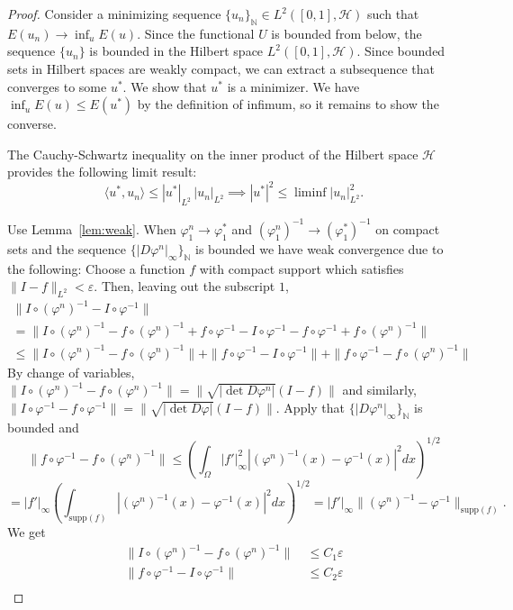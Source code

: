 \documentclass{article}
\theoremstyle{plain}
\theoremstyle{definition}
\newcommand{\N}{\ensuremath{\mathbb{N}}}
\begin{document}
\begin{proof}
Consider a minimizing sequence $\{u_n\}_\N \in L^2([0,1],\mathcal{H})$ such that $E(u_n)\to \inf_u E(u)$. Since the functional $U$ is bounded from below, the sequence $\{u_n\}$ is bounded in the Hilbert space $L^2([0,1],\mathcal{H})$. Since bounded sets in Hilbert spaces are weakly compact, we can extract a subsequence that converges to some $u^*$. We show that $u^*$ is a minimizer. We have $\inf_u E(u)\leq E(u^*)$ by the definition of infimum, so it remains to show the converse.

The Cauchy-Schwartz inequality on the inner product of the Hilbert space $\mathcal{H}$ provides the following limit result:
\[
\langle u^*,u_n\rangle\leq |u^*|_{L^2}\,|u_n|_{L^2} \implies |u^*|^2\leq \liminf |u_n|^2_{L^2}.
\]

Use Lemma~\ref{lem:weak}. 
When $\varphi_1^n\to \varphi_1^*$ and $(\varphi_1^n)^{-1}\to (\varphi_1^*)^{-1}$ on compact sets and the sequence $\{|D\varphi^n|_\infty\}_\N$ is bounded we have weak convergence due to the following: Choose a function $f$ with compact support which satisfies $\|I-f\|_{L^2}<\varepsilon$. Then, leaving out the subscript $1$,
%
\begin{multline*}
\|I\circ (\varphi^n)^{-1} - I\circ \varphi^{-1}\|\\
=\|I\circ (\varphi^n)^{-1}- f\circ(\varphi^n)^{-1}+f\circ \varphi^{-1}- I\circ \varphi^{-1} -f\circ \varphi^{-1}+f\circ(\varphi^n)^{-1}\|\\
\leq \|I\circ (\varphi^n)^{-1}- f\circ(\varphi^n)^{-1}\|+\|f\circ \varphi^{-1}- I\circ \varphi^{-1}\|+\|f\circ \varphi^{-1}-f\circ(\varphi^n)^{-1}\|
\end{multline*}
%
By change of variables, $\|I\circ (\varphi^n)^{-1}- f\circ(\varphi^n)^{-1}\|=\|\sqrt{|\det D\varphi^n|}(I-f)\|$ and similarly, $\|I\circ \varphi^{-1}-f\circ\varphi^{-1}\|=\|\sqrt{|\det D\varphi|}(I-f)\|$. Apply that $\{|D\varphi^n|_\infty\}_\N$ is bounded and
\[
\|f\circ \varphi^{-1}-f\circ(\varphi^n)^{-1}\|\leq \left(\int_\Omega |f'|^2_\infty|(\varphi^n)^{-1}(x)-\varphi^{-1}(x)|^2dx\right)^{1/2}
\]
\[
=|f'|_\infty\left(\int_{\mathrm{supp}(f)} |(\varphi^n)^{-1}(x)-\varphi^{-1}(x)|^2dx\right)^{1/2}=|f'|_\infty\|(\varphi^n)^{-1}-\varphi^{-1}\|_{\mathrm{supp}(f)}.
\]
We get
%
\begin{align*}
\|I\circ (\varphi^n)^{-1}- f\circ(\varphi^n)^{-1}\|&\ \leq C_1 \varepsilon \\
\|f\circ \varphi^{-1}- I\circ \varphi^{-1}\| &\ \leq C_2 \varepsilon \\

\end{align*}
\end{proof}
\end{document}
